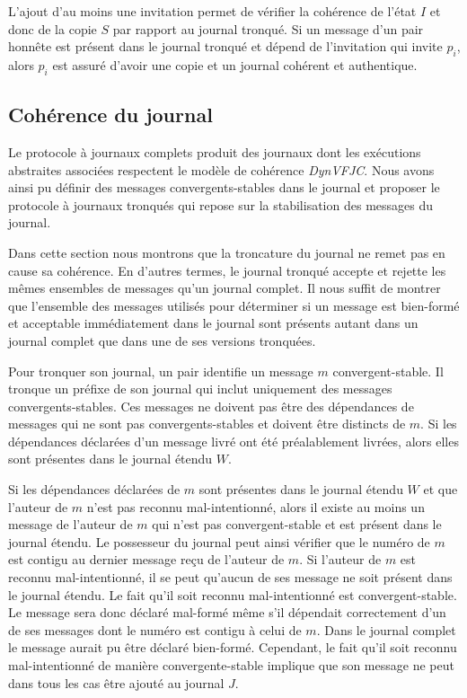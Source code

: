 L'ajout d'au moins une invitation permet de vérifier la cohérence de l'état $I$ et donc de la copie $S$ par rapport au journal tronqué.
Si un message d'un pair honnête est présent dans le journal tronqué et dépend de l'invitation qui invite $p_i$, alors $p_i$ est assuré d'avoir une copie et un journal cohérent et authentique.


\subsection{Cohérence du journal}

Le protocole à journaux complets produit des journaux dont les exécutions abstraites associées respectent le modèle de cohérence \emph{DynVFJC}.
Nous avons ainsi pu définir des messages convergents-stables dans le journal et proposer le protocole à journaux tronqués qui repose sur la stabilisation des messages du journal.

Dans cette section nous montrons que la troncature du journal ne remet pas en cause sa cohérence.
En d'autres termes, le journal tronqué accepte et rejette les mêmes ensembles de messages qu'un journal complet.
Il nous suffit de montrer que l'ensemble des messages utilisés pour déterminer si un message est bien-formé et acceptable immédiatement dans le journal sont présents autant dans un journal complet que dans une de ses versions tronquées.

Pour tronquer son journal, un pair identifie un message $m$ convergent-stable.
Il tronque un préfixe de son journal qui inclut uniquement des messages convergents-stables.
Ces messages ne doivent pas être des dépendances de messages qui ne sont pas convergents-stables et doivent être distincts de $m$.
Si les dépendances déclarées d'un message livré ont été préalablement livrées, alors elles sont présentes dans le journal étendu $W$.

Si les dépendances déclarées de $m$ sont présentes dans le journal étendu $W$ et que l'auteur de $m$ n'est pas reconnu mal-intentionné, alors il existe au moins un message de l'auteur de $m$ qui n'est pas convergent-stable et est présent dans le journal étendu.
Le possesseur du journal peut ainsi vérifier que le numéro de $m$ est contigu au dernier message reçu de l'auteur de $m$.
Si l'auteur de $m$ est reconnu mal-intentionné, il se peut qu'aucun de ses message ne soit présent dans le journal étendu.
Le fait qu'il soit reconnu mal-intentionné est convergent-stable.
Le message sera donc déclaré mal-formé même s'il dépendait correctement d'un de ses messages dont le numéro est contigu à celui de $m$.
Dans le journal complet le message aurait pu être déclaré bien-formé.
Cependant, le fait qu'il soit reconnu mal-intentionné de manière convergente-stable implique que son message ne peut dans tous les cas être ajouté au journal $J$.

